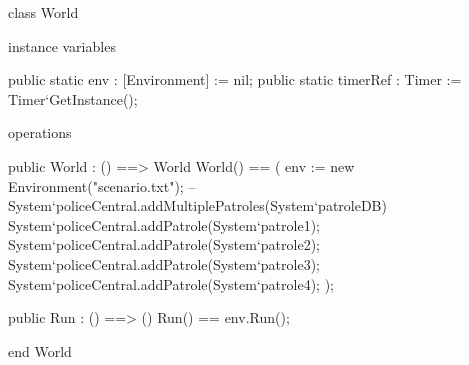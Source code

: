 \documentclass[a4paper]{article}
\begin{document}
\title{}
\author{}
\begin{vdm_al}
class World

instance variables  

public static env : [Environment] := nil;
  public static timerRef : Timer := Timer`GetInstance();

operations

public World : () ==> World
World() ==
  (
    env := new Environment("scenario.txt");
    --System`policeCentral.addMultiplePatroles(System`patroleDB)
    System`policeCentral.addPatrole(System`patrole1);
    System`policeCentral.addPatrole(System`patrole2);
    System`policeCentral.addPatrole(System`patrole3);
    System`policeCentral.addPatrole(System`patrole4);
  );

public Run : () ==> ()
Run() ==
  env.Run();

end World
\end{vdm_al}
\end{document}
